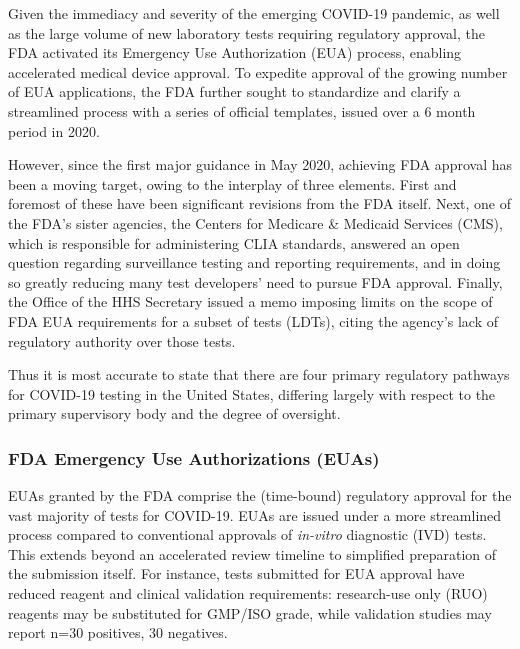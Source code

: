             Given the immediacy and severity of the emerging COVID-19 pandemic, as well as the large volume of new laboratory tests requiring regulatory approval, the FDA activated its Emergency Use Authorization (EUA) process, enabling accelerated medical device approval.\cite{Dong2020,Hasell2020} To expedite approval of the growing number of EUA applications, the FDA further sought to standardize and clarify a streamlined process with a series of official templates, issued over a 6 month period in 2020.

            

            However, since the first major guidance in May 2020, achieving FDA approval has been a moving target, owing to the interplay of three elements. First and foremost of these have been significant revisions from the FDA itself.\cite{FDAEUA2021} Next, one of the FDA’s sister agencies, the Centers for Medicare \& Medicaid Services (CMS), which is responsible for administering CLIA standards, answered an open question regarding surveillance testing and reporting requirements, and in doing so greatly reducing many test developers’ need to pursue FDA approval. Finally, the Office of the HHS Secretary issued a memo imposing limits on the scope of FDA EUA requirements for a subset of tests (LDTs), citing the agency’s lack of regulatory authority over those tests.

            Thus it is most accurate to state that there are four  primary regulatory pathways for COVID-19 testing in the United States, differing largely with respect to the primary supervisory body and the degree of oversight.

            

        \subsubsection{FDA Emergency Use Authorizations (EUAs)}

            EUAs granted by the FDA comprise the (time-bound) regulatory approval for the vast majority of tests for COVID-19. EUAs are issued under a more streamlined process compared to conventional approvals of \emph{in-vitro} diagnostic (IVD) tests. This extends beyond an accelerated review timeline to simplified preparation of the submission itself. For instance, tests submitted for EUA approval have reduced reagent and clinical validation requirements: research-use only (RUO) reagents may be substituted for GMP/ISO grade, while validation studies may report n=30 positives, 30 negatives.


